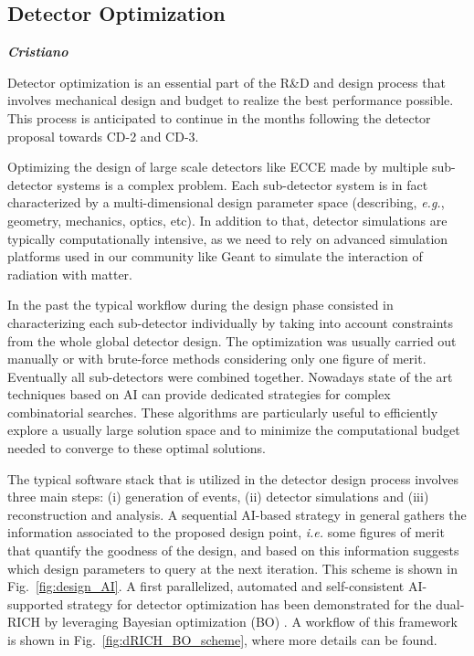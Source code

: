 \subsection{Detector Optimization}
\label{sec:codesign}
\textbf{\emph{Cristiano}}


Detector optimization is an essential part of the R\&D and design process that involves mechanical design and budget to realize the best performance possible.  
This process is anticipated to continue in the months following the detector proposal towards CD-2 and CD-3. 

Optimizing the design of large scale detectors like ECCE made by multiple sub-detector systems is a complex problem. 
Each sub-detector system is in fact characterized by a multi-dimensional design parameter space (describing, \textit{e.g.}, geometry, mechanics, optics, etc). 
In addition to that, detector simulations are typically computationally intensive, as we need to rely on advanced simulation platforms used in our community like Geant \cite{Agostinelli:2002hh} to simulate the interaction of radiation with matter. 

In the past the typical workflow during the design phase consisted in characterizing each sub-detector individually by taking into account constraints from the whole global detector design.
The optimization was usually carried out manually or with brute-force methods considering only one figure of merit. Eventually all sub-detectors were combined together.
Nowadays state of the art techniques based on AI can provide dedicated strategies for complex combinatorial searches. 
These algorithms are particularly useful to efficiently explore a usually large solution space and to minimize the computational budget needed to converge to these optimal solutions. 

The typical software stack that is utilized in the detector design process involves three main steps:
(i) generation of events, (ii) detector simulations
and (iii) reconstruction and analysis. 
%
A sequential AI-based strategy in general gathers the information associated to the proposed design point, \textit{i.e.} some figures of merit that quantify the goodness of the design, and based on this information suggests which design parameters to query at the next iteration. This scheme is shown in Fig.~\ref{fig:design_AI}. 
%
A first parallelized, automated and self-consistent AI-supported strategy for detector optimization has been demonstrated for the dual-RICH by \cite{cisbani2020ai} leveraging Bayesian optimization (BO) \cite{snoek2012practical}. 
A workflow of this framework is shown in Fig.~\ref{fig:dRICH_BO_scheme}, where more details can be found. 



